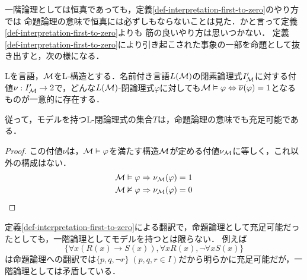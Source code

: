 \documentclass[uplatex, dvipdfmx]{jsreport}
\begin{document}
一階論理としては恒真であっても，定義\ref{def-interpretation-first-to-zero}のやり方では
命題論理の意味で恒真には必ずしもならないことは見た．かと言って定義\ref{def-interpretation-first-to-zero}よりも
筋の良いやり方は思いつかない．
定義\ref{def-interpretation-first-to-zero}により引き起こされた事象の一部を命題として抜き出すと，次の様になる．

\begin{lemma}
    Lを言語，$\mathcal{M}$をL-構造とする．名前付き言語$L(\mathcal{M})$の閉素論理式$I'_{\mathcal{M}}$に対する付値$\nu:I'_{\mathcal{M}}\to 2$で，どんな$L(\mathcal{M})$-閉論理式$\varphi$に対しても$\mathcal{M}\vDash\varphi\Leftrightarrow\overline{\nu}(\varphi)=1$となるものが一意的に存在する．

    従って，モデルを持つL-閉論理式の集合$T$は，命題論理の意味でも充足可能である．
\end{lemma}
\begin{proof}
    この付値$\nu$は，$\mathcal{M}\vDash\varphi$を満たす構造$\mathcal{M}$が定める付値$\nu_{\mathcal{M}}$に等しく，これ以外の構成はない．
    \begin{align*}
        \mathcal{M}\vDash\varphi&\Rightarrow\nu_{\mathcal{M}}(\varphi)=1\\
        \mathcal{M}\nvDash\varphi&\Rightarrow\nu_{\mathcal{M}}(\varphi)=0
    \end{align*}
\end{proof}
\begin{remark}[逆の反例]
    定義\ref{def-interpretation-first-to-zero}による翻訳で，命題論理として充足可能だったとしても，一階論理としてモデルを持つとは限らない．
    例えば\[\{\forall x(R(x)\to S(x)),\forall xR(x),\lnot\forall xS(x)\}\]
    は命題論理への翻訳では$\{p,q,\lnot r\}\;(p,q,r\in I)$だから明らかに充足可能だが，一階論理としては矛盾している．
\end{remark}
\end{document}
